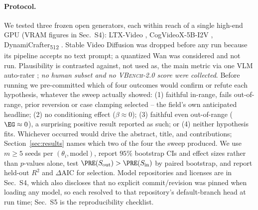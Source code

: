 \documentclass[10pt,twocolumn,letterpaper]{article}
\begin{document}
\paragraph{Protocol.}
We tested three frozen open generators, each within reach of a single
high-end GPU (VRAM figures in Sec.~S4): LTX-Video
\citep{hacohen2024ltxvideo}, CogVideoX-5B-I2V \citep{yang2024cogvideox},
DynamiCrafter\textsubscript{512} \citep{xing2024dynamicrafter}. Stable Video
Diffusion \citep{blattmann2023svd} was dropped before any run because its
pipeline accepts no text prompt; a quantized Wan \citep{wan2025} was
considered and not run. Plausibility is contrasted against, not used as, the
main metric via one VLM auto-rater \citep{qwen25vl}; \emph{no human subset
and no \textsc{VBench-2.0} score were collected}. Before running we
pre-committed which of four outcomes would confirm or refute each
hypothesis, whatever the sweep actually showed: (1) faithful in-range,
fails out-of-range, prior reversion or case clamping selected -- the
field's own anticipated headline; (2) no conditioning effect
($\beta\approx0$); (3) faithful even out-of-range ($\EG\approx0$), a
surprising positive result reported as such; or (4) neither hypothesis
fits. Whichever occurred would drive the abstract, title, and
contributions; Section~\ref{sec:results} names which two of the four the
sweep produced. We use $m\ge5$ seeds per $(\theta_i,\text{model})$, report $95\%$ bootstrap CIs and effect
sizes rather than $p$-values alone, test $\PRE(S_\text{out})>\PRE(S_\text{in})$ by
paired bootstrap, and report held-out $R^2$ and $\Delta$AIC for selection.
Model repositories and licenses are in Sec.~S4, which also discloses that
no explicit commit/revision was pinned when loading any model, so each
resolved to that repository's default-branch head at run time; Sec.~S5 is
the reproducibility checklist.

\begin{tightcenter}
\small
\setlength{\tabcolsep}{5pt}
\renewcommand{\arraystretch}{1.22}
\label{tab:coverage}
\end{tightcenter}
\end{document}

